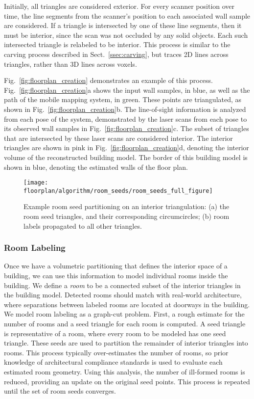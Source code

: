 \documentclass[journal]{IEEEtran}
\begin{document}
Initially, all triangles are considered exterior.  For every scanner position over time, the line segments from the scanner's position to each associated wall sample are considered.  If a triangle is intersected by one of these line segments, then it must be interior, since the scan was not occluded by any solid objects.  Each such intersected triangle is relabeled to be interior.  This process is similar to the carving process described in Sect.~\ref{ssec:carving}, but traces 2D lines across triangles, rather than 3D lines across voxels.

Fig.~\ref{fig:floorplan_creation} demonstrates an example of this process.  Fig.~\ref{fig:floorplan_creation}a shows the input wall samples, in blue, as well as the path of the mobile mapping system, in green.  These points are triangulated, as shown in Fig.~\ref{fig:floorplan_creation}b.  The line-of-sight information is analyzed from each pose of the system, demonstrated by the laser scans from each pose to its observed wall samples in Fig.~\ref{fig:floorplan_creation}c.  The subset of triangles that are intersected by these laser scans are considered interior.  The interior triangles are shown in pink in Fig.~\ref{fig:floorplan_creation}d, denoting the interior volume of the reconstructed building model.  The border of this building model is shown in blue, denoting the estimated walls of the floor plan.

\begin{figure}[t]
  \centering
  \texttt{[image: floorplan/algorithm/room\_seeds/room\_seeds\_full\_figure]}
  \caption{Example room seed partitioning on an interior triangulation: (a) the room seed triangles, and their corresponding circumcircles; (b) room labels propagated to all other triangles.}
  \label{fig:roomlabeling}
\end{figure}

\subsubsection{Room Labeling}
\label{sssec:rooms}

Once we have a volumetric partitioning that defines the interior space of a building, we can use this information to model individual rooms inside the building.  We define a \textit{room} to be a connected subset of the interior triangles in the building model.  Detected rooms should match with real-world architecture, where separations between labeled rooms are located at doorways in the building.  We model room labeling as a graph-cut problem.  First, a rough estimate for the number of rooms and a seed triangle for each room is computed.  A seed triangle is representative of a room, where every room to be modeled has one seed triangle.  These seeds are used to partition the remainder of interior triangles into rooms.  This process typically over-estimates the number of rooms, so prior knowledge of architectural compliance standards is used to evaluate each estimated room geometry.  Using this analysis, the number of ill-formed rooms is reduced, providing an update on the original seed points.  This process is repeated until the set of room seeds converges.
\end{document}

